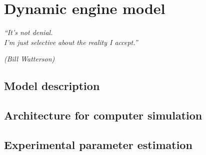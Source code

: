 \chapter{Dynamic engine model}
\epigraph{\em ``It's not denial.\\ I'm just selective about the reality I
accept.''}{\em(Bill Watterson)}
\section{Model description}
\section{Architecture for computer simulation}
\section{Experimental parameter estimation}
